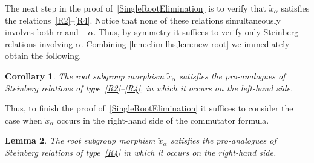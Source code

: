 \documentclass[oneside, 11pt]{amsart}
\numberwithin{equation}{section}
\newtheorem{lemma}{Lemma} \numberwithin{lemma}{section}
\newtheorem{corollary}[lemma]{Corollary}
\theoremstyle{definition}
\theoremstyle{remark}
\begin{document}
The next step in the proof of~\cref{SingleRootElimination} is to verify that $\widetilde{x}_\alpha$ satisfies the relations~\eqref{R2}--\eqref{R4}.
Notice that none of these relations simultaneously involves both \(\alpha\) and \(-\alpha\).
Thus, by symmetry it suffices to verify only Steinberg relations involving \(\alpha\).
Combining \cref{lem:elim-lhs,lem:new-root} we immediately obtain the following.
\begin{corollary} \label{cor:elim-lhs}
 The root subgroup morphism $\widetilde{x}_\alpha$ satisfies the pro-analogues of Steinberg relations of type~\eqref{R2}--\eqref{R4}, in which it occurs on the left-hand side.
\end{corollary}

Thus, to finish the proof of~\cref{SingleRootElimination} it suffices to consider the case when $\widetilde{x}_\alpha$ occurs in the right-hand side of the commutator formula.
\begin{lemma} \label{lem:elim-rhs-r4}
 The root subgroup morphism $\widetilde{x}_\alpha$ satisfies the pro-analogues of Steinberg relations of type~\eqref{R4} in which it occurs on the right-hand side.
\end{lemma}
\end{document}
